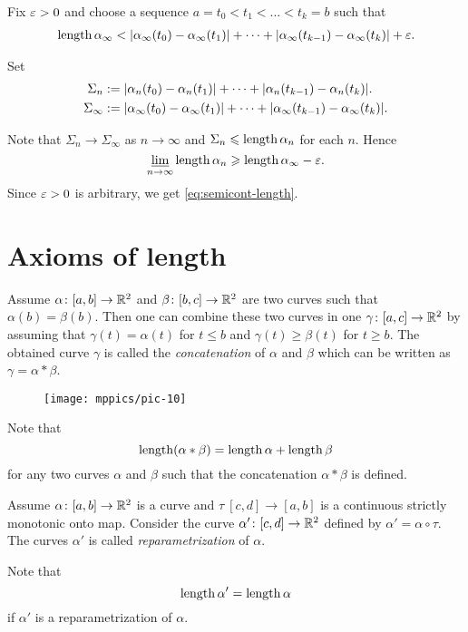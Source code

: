 Fix $\varepsilon > 0$ and choose a sequence $a=t_0<t_1<\dots<t_k=b$
such that 
\begin{align*}
\mathop{\rm length}\nolimits\alpha_\infty<
|\alpha_\infty(t_0)-\alpha_\infty(t_1)|+\dots+|\alpha_\infty(t_{k-1})-\alpha_\infty(t_k)|+\varepsilon.
\end{align*}

Set 
\begin{align*}\Sigma_n
&:=
|\alpha_n(t_0)-\alpha_n(t_1)|+\dots+|\alpha_n(t_{k-1})-\alpha_n(t_k)|.
\\
\Sigma_\infty
&:=
|\alpha_\infty(t_0)-\alpha_\infty(t_1)|+\dots+|\alpha_\infty(t_{k-1})-\alpha_\infty(t_k)|.
\end{align*}

Note that $\Sigma_n\to \Sigma_\infty$ as $n\to\infty$
and $\Sigma_n\leqslant\mathop{\rm length}\nolimits\alpha_n$ for each $n$.
Hence
$$\varliminf_{n\to\infty} \mathop{\rm length}\nolimits\alpha_n \geqslant \mathop{\rm length}\nolimits\alpha_\infty-\varepsilon.$$
Since $\varepsilon>0$ is arbitrary, we get \ref{eq:semicont-length}.\qeds

\section{Axioms of length}

Assume $\alpha\colon[a,b]\to \mathbb{R}^2$ and $\beta\:[b,c]\z\to \RR^2$ are two curves such that $\alpha(b)=\beta(b)$.
Then one can combine these two curves in one $\gamma\:[a,c]\z\to \RR^2$ by assuming that $\gamma(t)=\alpha(t)$ for $t\le b$ and $\gamma(t)\ge\beta(t)$ for $t\ge b$.
The obtained curve $\gamma$ is called the 
\emph{concatenation} of $\alpha$ and $\beta$ which can be written as $\gamma=\alpha*\beta$.

\begin{wrapfigure}{r}{30 mm}
\vskip-0mm
\centering
\texttt{[image: mppics/pic-10]}
\end{wrapfigure}

Note that
\[\mathop{\rm length}\nolimits(\alpha*\beta)=\mathop{\rm length}\nolimits\alpha+\mathop{\rm length}\nolimits\beta\]
for any two curves $\alpha$ and $\beta$ such that the concatenation $\alpha*\beta$ is defined.

Assume $\alpha\colon[a,b]\to \mathbb{R}^2$ is a curve and $\tau\:[c,d]\to [a,b]$ is a continuous strictly monotonic onto map.
Consider the curve $\alpha'\colon[c,d]\to \mathbb{R}^2$ defined by $\alpha'=\alpha\circ\tau$.
The curves $\alpha'$ is called \emph{reparametrization} of $\alpha$.

Note that 
\[\mathop{\rm length}\nolimits\alpha'=\mathop{\rm length}\nolimits\alpha\]
if $\alpha'$ is a reparametrization of $\alpha$.





